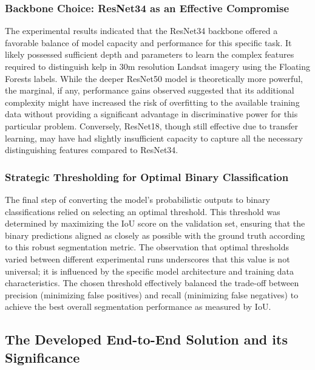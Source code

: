 \documentclass{article}
\begin{document}
\subsubsection{Backbone Choice: ResNet34 as an Effective Compromise}

The experimental results indicated that the ResNet34 backbone offered a favorable balance of model capacity and performance for this specific task. It likely possessed sufficient depth and parameters to learn the complex features required to distinguish kelp in 30m resolution Landsat imagery using the Floating Forests labels. While the deeper ResNet50 model is theoretically more powerful, the marginal, if any, performance gains observed suggested that its additional complexity might have increased the risk of overfitting to the available training data without providing a significant advantage in discriminative power for this particular problem. Conversely, ResNet18, though still effective due to transfer learning, may have had slightly insufficient capacity to capture all the necessary distinguishing features compared to ResNet34.

\subsubsection{Strategic Thresholding for Optimal Binary Classification}

The final step of converting the model's probabilistic outputs to binary classifications relied on selecting an optimal threshold. This threshold was determined by maximizing the IoU score on the validation set, ensuring that the binary predictions aligned as closely as possible with the ground truth according to this robust segmentation metric. The observation that optimal thresholds varied between different experimental runs underscores that this value is not universal; it is influenced by the specific model architecture and training data characteristics. The chosen threshold effectively balanced the trade-off between precision (minimizing false positives) and recall (minimizing false negatives) to achieve the best overall segmentation performance as measured by IoU.

\subsection{The Developed End-to-End Solution and its Significance}
\end{document}
